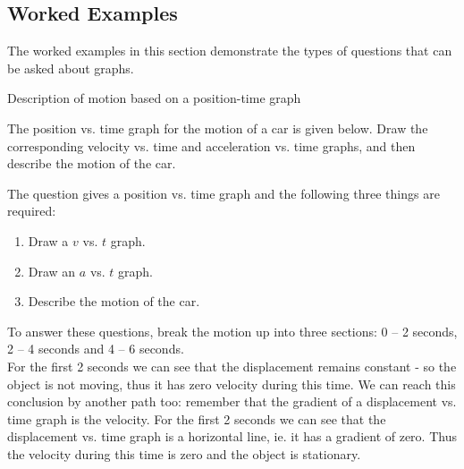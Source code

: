             \subsection*{Worked Examples}
            \nopagebreak
      \label{m38795*id73306}The worked examples in this section demonstrate the types of questions that can be asked about graphs.\par 
\begin{wex}{Description of motion based on a position-time graph}
{The position vs. time graph for the motion of a car is given below. Draw the corresponding velocity vs. time and acceleration vs. time graphs, and then describe the motion of the car.
\begin{center}
\end{center}}
{
The question gives a position vs. time graph and the following three things are required:
\begin{enumerate}[label=\textbf{\arabic*}.]
\item Draw a $v$ vs. $t$ graph.
\item Draw an $a$ vs. $t$ graph.
\item Describe the motion of the car.
\end{enumerate}
To answer these questions, break the motion up into three sections: 0 -- 2 seconds, 2 -- 4 seconds and 4 -- 6 seconds.\\

For the first 2 seconds we can see that the displacement remains constant - so the object is not moving, thus it has zero velocity during this time. We can reach this conclusion by another path too: remember that the gradient of a displacement vs. time graph is the velocity. For the first 2 seconds we can see that the displacement vs. time graph is a horizontal line, ie. it has a gradient of zero. Thus the velocity during this time is zero and the object is stationary.\\

}
\end{wex}
